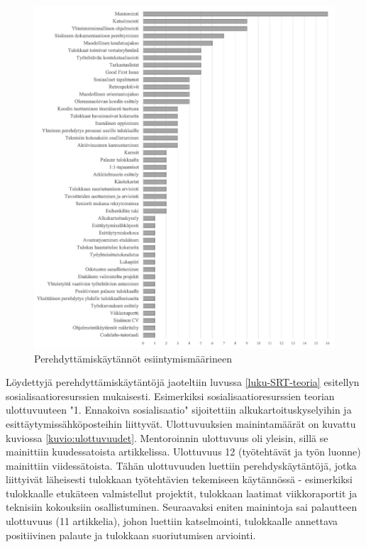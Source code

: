 \documentclass[utf8]{gradu3}
\begin{document}
\begin{figure}[h]
    \centering
    \includegraphics[width=\textwidth]{media/45-kaytannot.png}
    \caption{Perehdyttämiskäytännöt esiintymismäärineen}
    \label{kuvio:kaytannot}
\end{figure}

Löydettyjä perehdyttämiskäytäntöjä jaoteltiin luvussa \ref{luku-SRT-teoria} esitellyn sosialisaatioresurssien mukaisesti. Esimerkiksi sosialisaatioresurssien teorian ulottuvuuteen "1. Ennakoiva sosialisaatio" sijoitettiin alkukartoituskyselyihin ja esittäytymissähköposteihin liittyvät. Ulottuvuuksien mainintamäärät on kuvattu kuviossa \ref{kuvio:ulottuvuudet}. Mentoroinnin ulottuvuus oli yleisin, sillä se
mainittiin kuudessatoista artikkelissa. Ulottuvuus 12 (työtehtävät ja työn luonne) mainittiin viidessätoista. Tähän ulottuvuuden luettiin perehdyskäytäntöjä, jotka liittyivät läheisesti tulokkaan työtehtävien tekemiseen käytännössä - esimerkiksi tulokkaalle etukäteen valmistellut projektit, tulokkaan laatimat viikkoraportit ja teknisiin kokouksiin osallistuminen. Seuraavaksi eniten mainintoja sai palautteen ulottuvuus (11 artikkelia), johon luettiin katselmointi, tulokkaalle annettava positiivinen palaute ja tulokkaan suoriutumisen arviointi.
\end{document}
